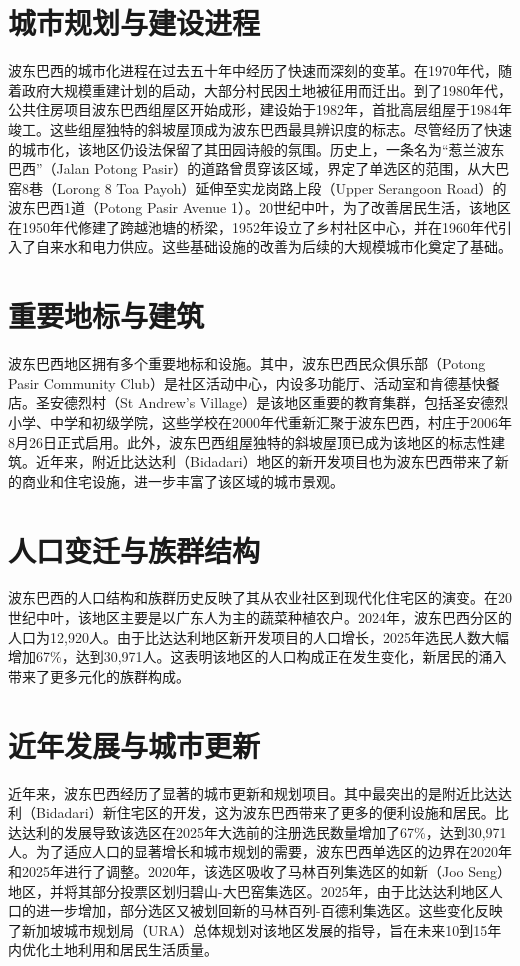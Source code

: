 \documentclass[11pt,a4paper,twoside,openany]{book}
\begin{document}
\section{城市规划与建设进程}
波东巴西的城市化进程在过去五十年中经历了快速而深刻的变革。在1970年代，随着政府大规模重建计划的启动，大部分村民因土地被征用而迁出。到了1980年代，公共住房项目波东巴西组屋区开始成形，建设始于1982年，首批高层组屋于1984年竣工。这些组屋独特的斜坡屋顶成为波东巴西最具辨识度的标志。尽管经历了快速的城市化，该地区仍设法保留了其田园诗般的氛围。历史上，一条名为“惹兰波东巴西”（Jalan Potong Pasir）的道路曾贯穿该区域，界定了单选区的范围，从大巴窑8巷（Lorong 8 Toa Payoh）延伸至实龙岗路上段（Upper Serangoon Road）的波东巴西1道（Potong Pasir Avenue 1）。20世纪中叶，为了改善居民生活，该地区在1950年代修建了跨越池塘的桥梁，1952年设立了乡村社区中心，并在1960年代引入了自来水和电力供应。这些基础设施的改善为后续的大规模城市化奠定了基础。

\section{重要地标与建筑}
波东巴西地区拥有多个重要地标和设施。其中，波东巴西民众俱乐部（Potong Pasir Community Club）是社区活动中心，内设多功能厅、活动室和肯德基快餐店。圣安德烈村（St Andrew's Village）是该地区重要的教育集群，包括圣安德烈小学、中学和初级学院，这些学校在2000年代重新汇聚于波东巴西，村庄于2006年8月26日正式启用。此外，波东巴西组屋独特的斜坡屋顶已成为该地区的标志性建筑。近年来，附近比达达利（Bidadari）地区的新开发项目也为波东巴西带来了新的商业和住宅设施，进一步丰富了该区域的城市景观。

\section{人口变迁与族群结构}
波东巴西的人口结构和族群历史反映了其从农业社区到现代化住宅区的演变。在20世纪中叶，该地区主要是以广东人为主的蔬菜种植农户。2024年，波东巴西分区的人口为12,920人。由于比达达利地区新开发项目的人口增长，2025年选民人数大幅增加67\%，达到30,971人。这表明该地区的人口构成正在发生变化，新居民的涌入带来了更多元化的族群构成。

\section{近年发展与城市更新}
近年来，波东巴西经历了显著的城市更新和规划项目。其中最突出的是附近比达达利（Bidadari）新住宅区的开发，这为波东巴西带来了更多的便利设施和居民。比达达利的发展导致该选区在2025年大选前的注册选民数量增加了67\%，达到30,971人。为了适应人口的显著增长和城市规划的需要，波东巴西单选区的边界在2020年和2025年进行了调整。2020年，该选区吸收了马林百列集选区的如新（Joo Seng）地区，并将其部分投票区划归碧山-大巴窑集选区。2025年，由于比达达利地区人口的进一步增加，部分选区又被划回新的马林百列-百德利集选区。这些变化反映了新加坡城市规划局（URA）总体规划对该地区发展的指导，旨在未来10到15年内优化土地利用和居民生活质量。
\end{document}
